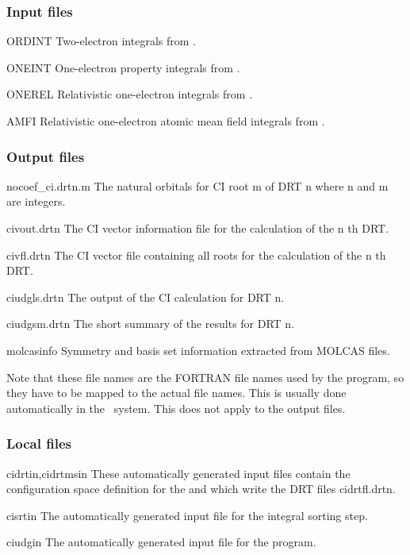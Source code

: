 \subsubsection{Input files}

\begin{filelist}
\item[ORDINT]
{Two-{}electron integrals from .}
\item[ONEINT]
{One-{}electron property integrals from .}
\item[ONEREL]
{Relativistic one-electron integrals from .}
\item[AMFI]
{Relativistic one-electron atomic mean field integrals from .}
\end{filelist}

\subsubsection{Output files}
\begin{filelist}
\item[nocoef\_ci.drtn.m]
The natural orbitals for CI root m of DRT n where n and m are
integers.
\item[civout.drtn]
The CI vector information file for the calculation of the n th 
DRT. 
\item[civfl.drtn]
The CI vector file containing all roots for the calculation of the n th 
DRT. 
\item[ciudgls.drtn]
The output of the CI calculation for DRT n.
\item[ciudgsm.drtn]
The short summary of the results for DRT n.
\item[molcasinfo]
Symmetry and basis set information extracted from MOLCAS files.
\end{filelist}

Note that these file names are the FORTRAN file names used by the program,
so they have to be mapped to the actual file names. This is usually done
automatically in the \molcas\ system. This does not apply to the output
files. 

\subsubsection{Local files}
\begin{filelist}
\item[cidrtin,cidrtmsin]
 These automatically generated 
 input files contain the configuration space definition for the 
  and  which write the DRT files
 cidrtfl.drtn.  
\item[cisrtin]
 The automatically generated input file for the integral sorting step. 
\item[ciudgin]
 The automatically generated input file for the 
 program.
\end{filelist}

